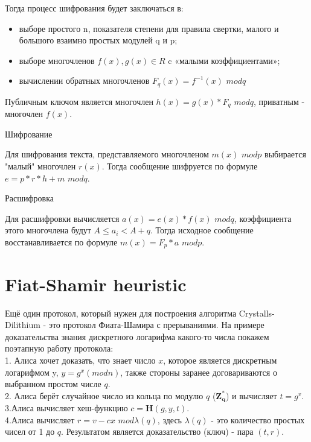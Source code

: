\documentclass{article}
\begin{document}
	Тогда процесс шифрования будет заключаться в:
	\begin{itemize}
		\item выборе простого n, показателя степени для правила свертки, малого и большого взаимно простых модулей q и p;
		\item выборе многочленов $f(x), g(x) \in R$ c «малыми коэффициентами»;
		\item  вычислении обратных многочленов $F_{q}(x)=f^{-1}(x)$ $modq$
		\end{itemize}
	
	Публичным ключом является многочлен $h(x)=g(x)*F_{q}$ $modq$, приватным - многочлен $f(x)$.
	
	Шифрование
	
	Для шифрования текста, представляемого многочленом $m(x)$ $modp$ выбирается "малый" многочлен $r(x)$. Тогда сообщение шифруется по формуле $e = p*r*h + m$ $modq$.
	
	Расшифровка
	
	Для расшифровки вычисляется $a(x)=e(x) * f(x)$ $modq$, коэффициента этого многочлена будут $A \leq a_{i} < A + q$. Тогда исходное сообщение восстанавливается по формуле $m(x)=F_{p}*a$ $modp$.
	
	
	\section{
		Fiat-Shamir heuristic
	}
	Ещё один протокол, который нужен для построения алгоритма Crystalls-Dilithium - это протокол Фиата-Шамира с прерываниями. На примере доказательства знания дискретного логарифма какого-то числа покажем поэтапную работу протокола:\\
	
	1. Алиса хочет доказать, что знает число $x$, которое является дискретным логарифмом y, $y = g^x (modn)$, также стороны заранее договариваются о выбранном простом числе $q$.\\
	
	2. Алиса берёт случайное число из кольца по модулю $q$ ($\mathbf{Z^*_{q}}$) и вычисляет $t=g^v$.\\
	
	3.Алиса вычисляет хеш-функцию $c=\mathbf{H}(g,y,t)$.\\
	
	4.Алиса вычисляет $r=v-cx$ \space $mod\lambda(q)$, здесь $\lambda(q)$ - это количество простых чисел от 1 до $q$. Результатом является доказательство (ключ) - пара $(t,r)$.\\
	
\end{document}
